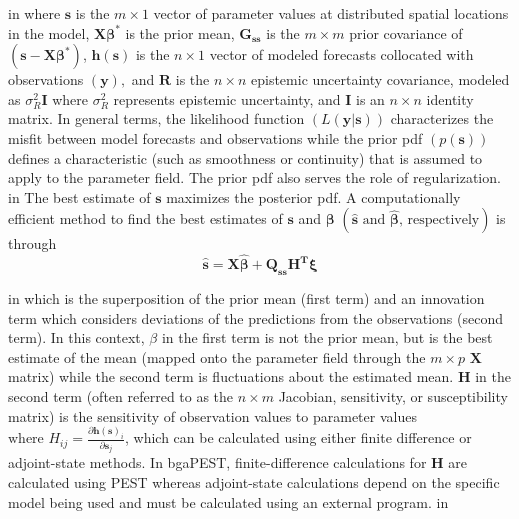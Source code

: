 \documentclass[11pt,oneside,onecolumn]{usgsreport}
\begin{document}
\begin{appendix}
\begin{bibunit}
 in
where \textbf{$\mathbf{s}$ }is the $m\times1$ vector of parameter
values at distributed spatial locations in the model, $\mathbf{X\beta^{*}}$
is the prior mean, $\mathbf{G_{ss}}$ is the $m\times m$ prior covariance
of $\left(\mathbf{s}-\mathbf{X\beta^{*}}\right)$, $\mathbf{h\left(\mathbf{s}\right)}$
is the $n\times1$ vector of modeled forecasts collocated with observations
$\left(\mathbf{y}\right),$ and \textbf{$\mathbf{R}$ }is the $n\times n$
epistemic uncertainty covariance, modeled as $\sigma_{R}^{2}\mathbf{I}$
where $\sigma_{R}^{2}$ represents epistemic uncertainty, and $\mathbf{I}$
is an $n\times n$ identity matrix. In general terms, the likelihood
function $\left(L\left(\mathbf{y}|\mathbf{s}\right)\right)$ characterizes
the misfit between model forecasts and observations while the prior
pdf $\left(p\left(\mathbf{s}\right)\right)$ defines a characteristic
(such as smoothness or continuity) that is assumed to apply to the
parameter field. The prior pdf also serves the role of regularization. 
 in
The best estimate of $\mathbf{s}$ maximizes the posterior pdf. A
computationally efficient method to find the best estimates of $\mathbf{s}$
and $\mathbf{\beta}$ $\left(\hat{\mathbf{s}}\mbox{ and }\mathbf{\hat{\beta}}\mbox{, respectively}\right)$
is through
\begin{equation}
\hat{\mathbf{s}}=\mathbf{X\hat{\beta}+Q_{ss}H^{\mathbf{T}}\xi}\label{eq:bestest}
\end{equation}

 in
which is the superposition of the prior mean (first term) and an innovation
term which considers deviations of the predictions from the observations
(second term). In this context, $\beta$ in the first term is not
the prior mean, but is the best estimate of the mean (mapped onto
the parameter field through the $m\times p$ $\mathbf{X}$ matrix)
while the second term is fluctuations about the estimated mean. $\mathbf{H}$
in the second term (often referred to as the $n\times m$ Jacobian,
sensitivity, or susceptibility matrix) is the sensitivity of observation
values to parameter values $\mbox{where }H_{ij}=\frac{\partial\mathbf{h}\left(\mathbf{s}\right)_{i}}{\partial\mathbf{s}_{j}}$,
which can be calculated using either finite difference or adjoint-state
methods. In bgaPEST, finite-difference calculations for $\mathbf{H}$
are calculated using PEST whereas adjoint-state calculations depend
on the specific model being used and must be calculated using an external
program.
 in


\end{bibunit}
\end{appendix}
\end{document}
